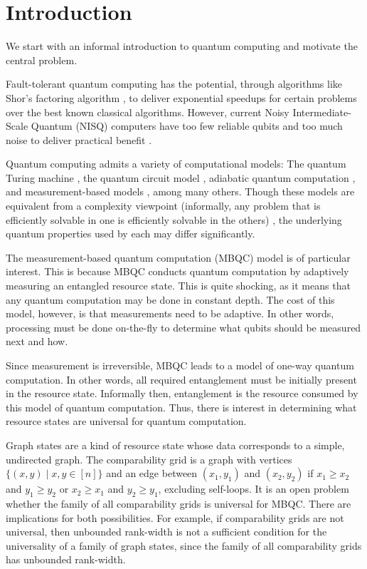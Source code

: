 \section{Introduction}

We start with an informal introduction to quantum computing and motivate the central problem.

Fault-tolerant quantum computing has the potential, through algorithms like Shor's factoring algorithm \cite{Shor}, to deliver exponential speedups for certain problems over the best known classical algorithms. However, current Noisy Intermediate-Scale Quantum (NISQ) computers have too few reliable qubits and too much noise to deliver practical benefit \cite{PreskillNISQ}.

Quantum computing admits a variety of computational models: The quantum Turing machine \cite{QuantumTM}, the quantum circuit model \cite{QuantumCircuit}, adiabatic quantum computation \cite{Adiabatic}, and measurement-based models \cite{MBQCOriginal}, among many others. Though these models are equivalent from a complexity viewpoint (informally, any problem that is efficiently solvable in one is efficiently solvable in the others) \cite{MBQCOriginal,AdiabaticEqCircuit,CircuitEqTM}, the underlying quantum properties used by each may differ significantly.

The measurement-based quantum computation (MBQC) model is of particular interest. This is because MBQC conducts quantum computation by adaptively measuring an entangled resource state. This is quite shocking, as it means that any quantum computation may be done in constant depth. The cost of this model, however, is that measurements need to be adaptive. In other words, processing must be done on-the-fly to determine what qubits should be measured next and how.

Since measurement is irreversible, MBQC leads to a model of one-way quantum computation. In other words, all required entanglement must be initially present in the resource state. Informally then, entanglement is the resource consumed by this model of quantum computation. Thus, there is interest in determining what resource states are universal for quantum computation.

Graph states are a kind of resource state whose data corresponds to a simple, undirected graph. The comparability grid is a graph with vertices $\{(x,y) \mid x,y \in [n]\}$ and an edge between $(x_1,y_1)$ and $(x_2,y_2)$ if $x_1 \geq x_2$ and $y_1 \geq y_2$ or $x_2 \geq x_1$ and $y_2 \geq y_1$, excluding self-loops. It is an open problem whether the family of all comparability grids is universal for MBQC. There are implications for both possibilities. For example, if comparability grids are not universal, then unbounded rank-width is not a sufficient condition for the universality of a family of graph states, since the family of all comparability grids has unbounded rank-width.

